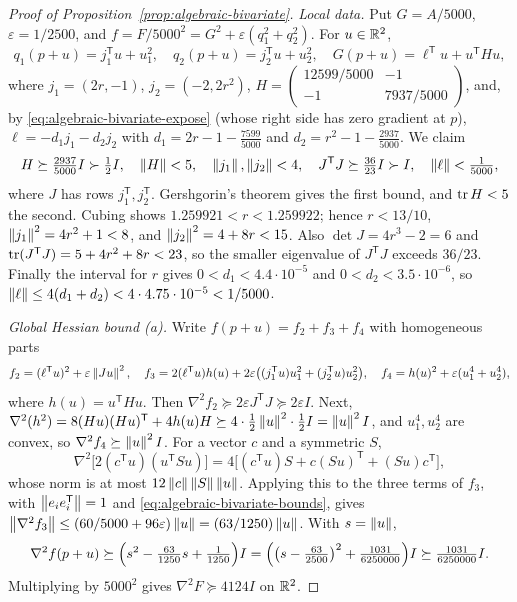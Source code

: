 \begin{proof}[Proof of Proposition~\ref{prop:algebraic-bivariate}]
\emph{Local data.} Put $G=A/5000$, $\varepsilon=1/2500$, and
$f=F/5000^2=G^2+\varepsilon(q_1^2+q_2^2)$. For $u\in\mathbb R^2$,
\[
 q_1(p+u)=j_1^{\mathsf T}u+u_1^2,\quad
 q_2(p+u)=j_2^{\mathsf T}u+u_2^2,\quad
 G(p+u)=\ell^{\mathsf T}u+u^{\mathsf T}Hu,
\]
where $j_1=(2r,-1)$, $j_2=(-2,2r^2)$,
$H=\left(\begin{smallmatrix}12599/5000&-1\\-1&7937/5000\end{smallmatrix}\right)$,
and, by \eqref{eq:algebraic-bivariate-expose} (whose right side has zero
gradient at $p$), $\ell=-d_1j_1-d_2j_2$ with $d_1=2r-1-\tfrac{7599}{5000}$ and
$d_2=r^2-1-\tfrac{2937}{5000}$. We claim
\begin{equation}
 H\succeq\tfrac{2937}{5000}I\succ\tfrac12I,\quad \left\lVert H\right\rVert<5,\quad
 \left\lVert j_1\right\rVert,\left\lVert j_2\right\rVert<4,\quad J^{\mathsf T}J\succeq\tfrac{36}{23}I\succ I,
 \quad \left\lVert\ell\right\rVert<\tfrac1{5000},
 \label{eq:algebraic-bivariate-bounds}
\end{equation}
where $J$ has rows $j_1^{\mathsf T},j_2^{\mathsf T}$. Gershgorin's theorem
gives the first bound, and $\operatorname{tr} H<5$ the second. Cubing shows
$1.259921<r<1.259922$; hence $r<13/10$, $\left\lVert j_1\right\rVert^2=4r^2+1<8$, and
$\left\lVert j_2\right\rVert^2=4+8r<15$. Also $\det J=4r^3-2=6$ and
$\operatorname{tr}(J^{\mathsf T}J)=5+4r^2+8r<23$, so the smaller eigenvalue of
$J^{\mathsf T}J$ exceeds $36/23$. Finally the interval for $r$ gives
$0<d_1<4.4\cdot10^{-5}$ and $0<d_2<3.5\cdot10^{-6}$, so
$\left\lVert\ell\right\rVert\le4(d_1+d_2)<4\cdot4.75\cdot10^{-5}<1/5000$.

\emph{Global Hessian bound (a).} Write $f(p+u)=f_2+f_3+f_4$ with homogeneous
parts
\[
 f_2=(\ell^{\mathsf T}u)^2+\varepsilon\left\lVert Ju\right\rVert^2,\quad
 f_3=2(\ell^{\mathsf T}u)h(u)+2\varepsilon\bigl((j_1^{\mathsf T}u)u_1^2
     +(j_2^{\mathsf T}u)u_2^2\bigr),\quad
 f_4=h(u)^2+\varepsilon(u_1^4+u_2^4),
\]
where $h(u)=u^{\mathsf T}Hu$. Then $\nabla^2f_2\succeq2\varepsilon J^{\mathsf
T}J\succeq2\varepsilon I$. Next,
$\nabla^2(h^2)=8(Hu)(Hu)^{\mathsf T}+4h(u)H\succeq4\cdot\tfrac12\left\lVert u\right\rVert^2\cdot
\tfrac12I=\left\lVert u\right\rVert^2I$, and $u_1^4,u_2^4$ are convex, so
$\nabla^2f_4\succeq\left\lVert u\right\rVert^2I$. For a vector $c$ and a symmetric $S$,
\[
 \nabla^2\bigl[2(c^{\mathsf T}u)(u^{\mathsf T}Su)\bigr]
  =4\bigl[(c^{\mathsf T}u)S+c(Su)^{\mathsf T}+(Su)c^{\mathsf T}\bigr],
\]
whose norm is at most $12\left\lVert c\right\rVert\left\lVert S\right\rVert\left\lVert u\right\rVert$. Applying this to the three
terms of $f_3$, with $\left\lVert e_ie_i^{\mathsf T}\right\rVert=1$ and
\eqref{eq:algebraic-bivariate-bounds}, gives
$\left\lVert\nabla^2f_3\right\rVert\le(60/5000+96\varepsilon)\left\lVert u\right\rVert=(63/1250)\left\lVert u\right\rVert$. With
$s=\left\lVert u\right\rVert$,
\[
 \nabla^2f(p+u)\succeq\Bigl(s^2-\tfrac{63}{1250}s+\tfrac1{1250}\Bigr)I
 =\Bigl(\bigl(s-\tfrac{63}{2500}\bigr)^2+\tfrac{1031}{6250000}\Bigr)I
 \succeq\tfrac{1031}{6250000}I .
\]
Multiplying by $5000^2$ gives $\nabla^2F\succeq4124I$ on $\mathbb R^2$.


\end{proof}

